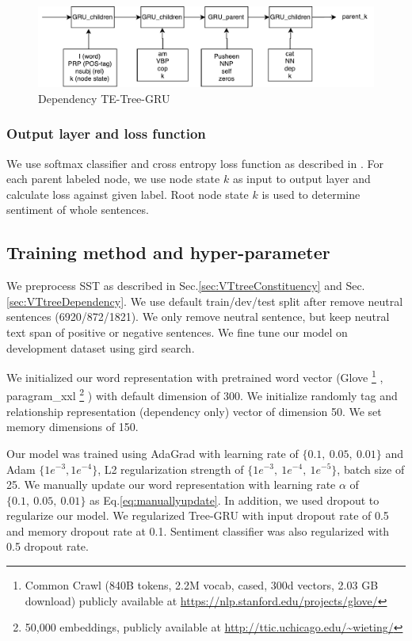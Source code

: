 \begin{figure}[H]
    \centering
    \includegraphics[width=0.9\linewidth]{figure/dependencyvtgru}
    \caption[Dependency TE-Tree-GRU]{Dependency TE-Tree-GRU}
    \label{fig:dependencyvtgru}
\end{figure}

\subsubsection{Output layer and loss function}
We use softmax classifier and cross entropy loss function as described in \cite{treeLSTM}.  For each parent labeled node, we use node state $k$ as input to output layer and calculate loss against given label. Root node state $k$ is used to determine sentiment of whole sentences.
\subsection{Training method and hyper-parameter}
We preprocess SST as described in Sec.\ref{sec:VTtreeConstituency} and Sec.\ref{sec:VTtreeDependency}. We use default train/dev/test split after remove neutral sentences (6920/872/1821). We only remove neutral sentence, but keep neutral text span of positive or negative sentences. We fine tune our model on development dataset using gird search.

We initialized our word representation with pretrained word vector (Glove \footnote{Common Crawl (840B tokens, 2.2M vocab, cased, 300d vectors, 2.03 GB download) publicly available at \url{https://nlp.stanford.edu/projects/glove/}} \cite{glove}, paragram\_xxl \footnote{50,000 embeddings, publicly available at \url{http://ttic.uchicago.edu/~wieting/}} \cite{wieting2015towards}) with default dimension of 300.  We initialize randomly tag and relationship representation (dependency only) vector of dimension 50. We set memory dimensions of 150. 

Our model was trained using AdaGrad \cite{duchi2011adaptive} with learning rate of $\{0.1,~ 0.05,~ 0.01\}$ and Adam $\{1e^{-3}, 1e^{-4}\}$, L2 regularization strength of $\{1e^{-3},~ 1e^{-4}, ~ 1e^{-5} \}$, batch size of 25. We manually update our word representation with learning rate $\alpha$ of $\{0.1,~0.05, ~0.01\}$ as Eq.\ref{eq:manuallyupdate}. In addition, we used dropout \cite{krizhevsky2012imagenet} to regularize our model. We regularized Tree-GRU with input dropout rate of 0.5 and memory dropout rate at 0.1. Sentiment classifier was also regularized with 0.5 dropout rate. 

